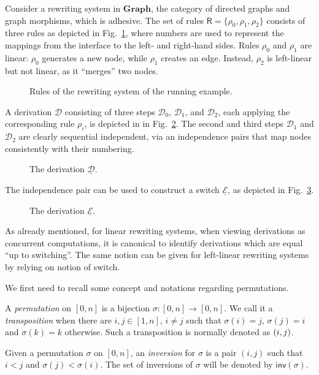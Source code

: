 \documentclass[a4paper,UKenglish,cleveref,pdftex,thm-restate,numberwithinsect,anonymous]{lipics}
\newcommand{\cat}[1]{\ensuremath{\mathbf{#1}}}
\newcommand{\interval}[2][1]{\ensuremath{[{#1},{#2}]}}
\newcommand{\perm}{\sigma}
\def\R{\mathsf{R}}
\newcommand{\dder}[1]{\mathscr{#1}}
\newcommand{\der}[1]{\underline{\dder{#1}}}
\newcommand{\inv}[1]{\mathsf{inv}({#1})}
\begin{document}
\begin{example}
  \label{ex:seq-ind}
  Consider a rewriting system in $\cat{Graph}$, the category of
  directed graphs and graph morphisms, which is adhesive. The set of
  rules $\R = \{ \rho_0, \rho_1, \rho_2\}$ consists of three rules as
  depicted in Fig.~\ref{fi:rules}, where numbers are used to represent
  the mappings from the interface to the left- and right-hand
  sides. Rules $\rho_0$ and $\rho_1$ are linear: $\rho_0$ generates a
  new node, while $\rho_1$ creates an edge. Instead, $\rho_2$ is
  left-linear but not linear, as it ``merges'' two nodes.


  \begin{figure}
    
    
    \caption{Rules of the rewriting system of the running example.}
    \label{fi:rules}
  \end{figure}
  
  A derivation $\der{D}$ consisting of three steps $\dder{D}_0$,
  $\dder{D}_1$, and $\dder{D}_2$, each applying the corresponding rule
  $\rho_i$, is depicted in in Fig.~\ref{fi:derD}. The second and third
  steps $\dder{D}_1$ and $\dder{D}_2$ are clearly sequential
  independent, via an independence pairs that map nodes consistently
  with their numbering.
  
  \begin{figure}
    
    \caption{The derivation $\der{D}$.}
    \label{fi:derD}
  \end{figure}

  The independence pair can be used to construct a switch $\der{E}$, as
  depicted in Fig.~\ref{fi:derE}.
  \begin{figure}
    
    \caption{The derivation $\der{E}$.}
    \label{fi:derE}
  \end{figure}
\end{example}


As already mentioned, for linear rewriting systems, when viewing
derivations as concurrent computations, it is canonical to identify
derivations which are equal ``up to switching''. The same notion can
be given for left-linear rewriting systems by relying on notion of
switch.


We first need to recall some concept and notations regarding permutations. 

\begin{definition}
	A \emph{permutation} on
	$\interval[0]{n}$ is a bijection
	$\sigma : \interval[0]{n} \to \interval[0]{n}$. We call it a
	\emph{transposition} when there are $i, j \in \interval{n}$,
	$i \neq j$ such that $\sigma(i)=j$, $\sigma(j) = i$ and
	$\sigma(k) = k$ otherwise. Such a transposition is normally denoted as
	$\transp{i}[j]$.
	
Given a permutation $\perm$ on $\interval[0]{n}$,  an \emph{inversion} for $\sigma$ is a pair $(i,j)$ such that $i<j$ and $\sigma(j)< \sigma(i)$. The set of inversions
of $\perm$ will be denoted by $\inv{\sigma}$.
\end{definition}
\end{document}
